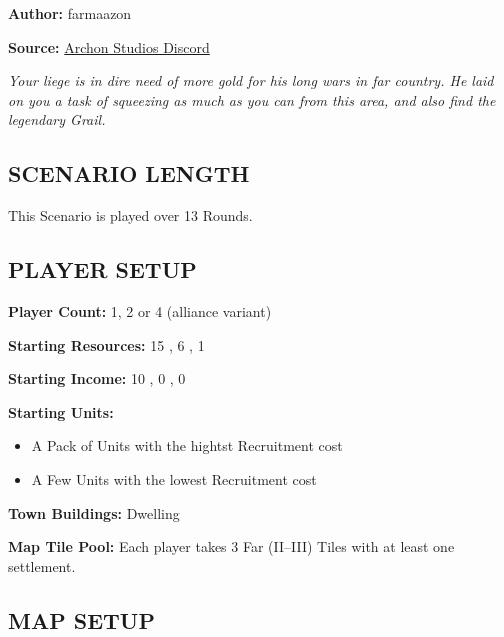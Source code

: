 
\begin{multicols*}{2}

\textbf{Author:} farmaazon

\textbf{Source:} \href{https://discordapp.com/channels/740870068178649108/1344400556717768865/1344400556717768865}{Archon Studios Discord}

\textit{Your liege is in dire need of more gold for his long wars in far country. He laid on you a task of squeezing as much as you can from this area, and also find the legendary Grail.}

\subsection*{\MakeUppercase{Scenario Length}}

This Scenario is played over 13 Rounds.

\subsection*{\MakeUppercase{Player Setup}}

\textbf{Player Count:} 1, 2 or 4 (alliance variant)

\textbf{Starting Resources:} 15 , 6 , 1 

\textbf{Starting Income:} 10 , 0 , 0 

\textbf{Starting Units:}
\begin{itemize}
  \item A Pack of  Units with the hightst Recruitment cost
  \item A Few  Units with the lowest Recruitment cost
\end{itemize}

\textbf{Town Buildings:}  Dwelling

\textbf{Map Tile Pool:} Each player takes 3 Far (II--III) Tiles with at least one settlement.

\vfill

\subsection*{\MakeUppercase{Map Setup}}


\end{multicols*}
